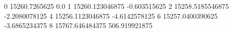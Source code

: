 0 15260.7265625 0.0
1 15260.123046875 -0.603515625
2 15258.5185546875 -2.2080078125
4 15256.1123046875 -4.6142578125
6 15257.0400390625 -3.6865234375
8 15767.646484375 506.919921875
